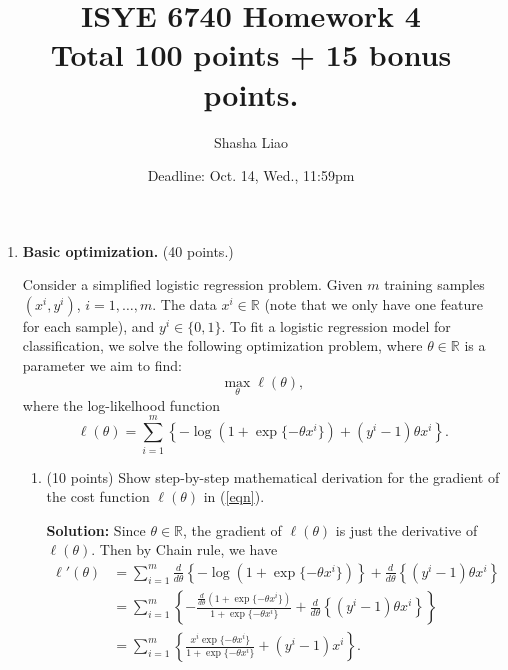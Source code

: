 \documentclass[twoside,10pt]{article}
\begin{document}
\title{ISYE 6740 Homework 4\\ 
\small Total 100 points + 15 bonus points. }
\author{Shasha Liao}
\date{Deadline: Oct. 14, Wed., 11:59pm}
\maketitle

\begin{enumerate}

\item {\bf Basic optimization.} (40 points.)

Consider a simplified logistic regression problem. 
Given $m$ training samples $(x^i, y^i)$, $i = 1, \ldots, m$. The data $x^i \in \mathbb R$ (note that we only have one feature for each sample), and $y^i \in \{0, 1\}$.  To fit a logistic regression model for classification, we solve the following optimization problem, where $\theta \in \mathbb R$ is a parameter we aim to find:
\begin{equation}
\max_\theta \ell (\theta), \label{eqn}
\end{equation}
where the log-likelhood function \[\ell(\theta) = \sum_{i=1}^m \left\{-\log (1+\exp\{-\theta x^i\}) + (y^i-1) \theta x^i\right\}.\]

\begin{enumerate}
\item (10 points) Show step-by-step mathematical derivation for the gradient of the cost function $\ell(\theta)$ in (\ref{eqn}).
\begin{tcolorbox}
\textbf{Solution:} Since $\theta \in \mathbb R$, the gradient of $\ell(\theta)$ is just the derivative of $\ell(\theta)$. Then by Chain rule, we have
\begin{align*}
 \ell'(\theta) &= \sum_{i=1}^m \frac{d}{d \theta} \left\{ -\log (1+\exp\{-\theta x^i\})\right\} + \frac{d}{d \theta} \left\{ (y^i-1) \theta x^i\right\}\\
 &= \sum_{i=1}^m \left\{  -\frac{\frac{d}{d \theta} (1+\exp\{-\theta x^i\}) }{1+\exp\{-\theta x^i\}}+ \frac{d}{d \theta} \left\{ (y^i-1) \theta x^i\right\}\right\}\\
 &= \sum_{i=1}^m  \left\{ \frac{x^i\exp\{-\theta x^i\}} {1+\exp\{-\theta x^i\}} + (y^i-1)x^i\right\}.\\
\end{align*}
\end{tcolorbox}


\end{enumerate}
\end{enumerate}
\end{document}
